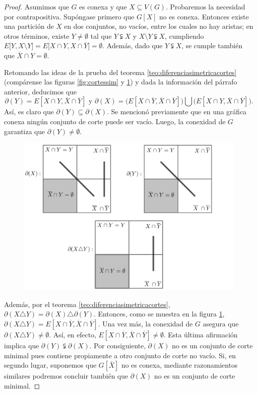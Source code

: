 \begin{proof} Asumimos que $G$ es conexa y que $X \subseteq V(G)$. Probaremos la necesidad por contrapositiva. Supóngase primero que $G[X]$ no es conexa. Entonces existe una partición de $X$ en dos conjuntos, no vacíos, entre los cuales no hay aristas; en otros términos, existe $Y \neq \emptyset$ tal que $Y \subsetneqq X$ y $X \setminus Y \subsetneqq X$, cumpliendo $E\big[Y, X \setminus Y \big] = E\big[X \cap Y, X \cap \overline{Y} \big] = \emptyset$. Además, dado que $Y \subsetneqq X$, se cumple también que $\overline{X} \cap Y = \emptyset$.

Retomando las ideas de la prueba del teorema \ref{teo:diferenciasimetricacortes} (compárense las figuras \ref{fig:cortessim} y \ref{fig:bond2}) y dada la información del párrafo anterior, deducimos que $$\partial(Y) = E[X \cap Y, \overline{X} \cap \overline{Y}] \text{ y } \partial(X) = \big(E[X \cap \overline{Y}, \overline{X} \cap \overline{Y}]\big) \bigcup \big(E[X \cap Y, \overline{X} \cap \overline{Y}]\big).$$ Así, es claro que $\partial (Y) \subseteq \partial(X)$. Se mencionó previamente que en una gráfica conexa ningún conjunto de corte puede ser vacío. Luego, la conexidad de $G$ garantiza que $\partial(Y) \neq \emptyset$.

\begin{figure}[H]
    \centering
    \includegraphics[scale=0.6]{img/imgchapter2/bond2.jpg}
    \caption{}
    \label{fig:bond2}
\end{figure}
Además, por el teorema \ref{teo:diferenciasimetricacortes}, $\partial(X \triangle Y)= \partial(X) \triangle \partial(Y)$. Entonces, como se muestra en la figura \ref{fig:bond2}, $\partial(X \triangle Y) = E[X \cap \overline{Y}, \overline{X} \cap \overline{Y}]$. Una vez más, la conexidad de $G$ asegura que $\partial(X \triangle Y) \neq \emptyset$. Así, en efecto, $E[X \cap \overline{Y}, \overline{X} \cap \overline{Y}] \neq \emptyset$. Esta última afirmación implica que $\partial(Y) \subsetneqq \partial(X)$. Por consiguiente, $\partial(X)$ no es un conjunto de corte minimal pues contiene propiamente a otro conjunto de corte no vacío. Si, en segundo lugar, suponemos que $G[\bar{X}]$ no es conexa, mediante razonamientos similares podremos concluir también que $\partial(X)$ no es un conjunto de corte minimal.



\end{proof}
